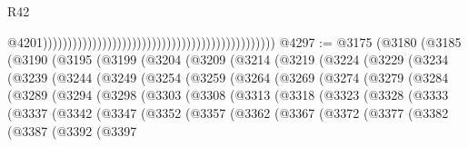 \begin{lexlean}{R42}
\begin{coremodule}
{                                                                                                  @4201)))))))))))))))))))))))))))))))))))))))))))))))
@4297 := @3175
    (@3180
      (@3185
        (@3190
          (@3195
            (@3199
              (@3204
                (@3209
                  (@3214
                    (@3219
                      (@3224
                        (@3229
                          (@3234
                            (@3239
                              (@3244
                                (@3249
                                  (@3254
                                    (@3259
                                      (@3264
                                        (@3269
                                          (@3274
                                            (@3279
                                              (@3284
                                                (@3289
                                                  (@3294
                                                    (@3298
                                                      (@3303
                                                        (@3308
                                                          (@3313
                                                            (@3318
                                                              (@3323
                                                                (@3328
                                                                  (@3333
                                                                    (@3337
                                                                      (@3342
                                                                        (@3347
                                                                          (@3352
                                                                            (@3357
                                                                              (@3362
                                                                                (@3367
                                                                                  (@3372
                                                                                    (@3377
                                                                                      (@3382
                                                                                        (@3387
                                                                                          (@3392
                                                                                            (@3397
}
\end{coremodule}
\end{lexlean}
